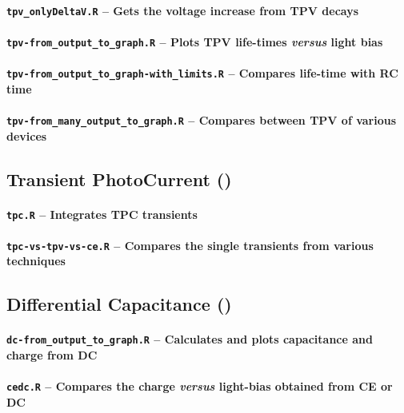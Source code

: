 				\paragraph{\texttt{tpv_onlyDeltaV.R} -- Gets the voltage increase from TPV decays}
				
		\paragraph{\texttt{tpv-from_output_to_graph.R} -- Plots TPV life\hyp{}times \textsl{versus} light bias}
		
		
\paragraph{\texttt{tpv-from_output_to_graph-with_limits.R} -- Compares life\hyp{}time with RC time}

		\paragraph{\texttt{tpv-from_many_output_to_graph.R} -- Compares between TPV of various devices}

	\subsection{Transient PhotoCurrent ()}\label{r_tpc}

		\paragraph{\texttt{tpc.R} -- Integrates TPC transients}
		\paragraph{\texttt{tpc-vs-tpv-vs-ce.R} -- Compares the single transients from various techniques}


	\subsection{Differential Capacitance ()}\label{r_dc}

		\paragraph{\texttt{dc-from_output_to_graph.R} -- Calculates and plots capacitance and charge from DC}
		
		\paragraph{\texttt{cedc.R} -- Compares the charge \textsl{versus} light\hyp{}bias obtained from CE or DC}
		
